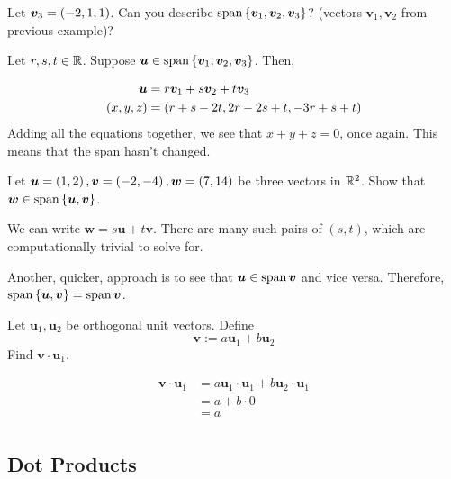 \documentclass[11pt]{article}
\begin{document}
\begin{example}
  
  Let $\bm{v}_3 = \left ( -2, 1, 1 \right)$.
  Can you describe $\operatorname{span} \left \{ \bm{v}_1, \bm{v}_2, \bm{v}_3 \right \}$? (vectors $\bm{v}_1, \bm{v}_2$ from previous example)?

  Let $r, s, t \in \mathbb R$.
  Suppose $\bm{u} \in \operatorname{span} \left \{ \bm{v}_1, \bm{v}_2, \bm{v}_3 \right \}$.
  Then,

  \begin{align*}
    \bm{u} &= r \bm{v}_1 + s \bm{v}_2 + t \bm{v}_3 \\
    \left ( x, y, z \right) &= \left ( r+s-2t, 2r-2s+t, -3r+s+t \right) \\
  \end{align*}
  Adding all the equations together, we see that $x+y+z=0$, once again.
  This means that the span hasn't changed.
\end{example}

\begin{example}
  
  Let $\bm{u} = \left ( 1,2 \right), \bm{v} = \left ( -2, -4 \right), \bm{w} = \left ( 7,14 \right)$ be three vectors in $\mathbb R^2$.
  Show that $\bm{w} \in \operatorname{span} \left \{ \bm{u}, \bm{v} \right \}$.

  We can write $\bm{w} = s \bm{u} + t \bm{v}$.
  There are many such pairs of $(s,t)$, which are computationally trivial to solve for.

  Another, quicker, approach is to see that $\bm{u} \in \operatorname{span} \bm{v}$ and vice versa.
  Therefore, $\operatorname{span} \left \{ \bm{u}, \bm{v} \right \} = \operatorname{span} \bm{v} $.
\end{example}

\begin{example}

  Let $\bm{u}_1, \bm{u}_2$ be orthogonal unit vectors.
  Define
  $$
  \bm{v} := a \bm{u}_1 + b \bm{u}_2
  $$
  Find $\bm{v} \cdot \bm{u}_1$.

  \begin{align*}
    \bm{v} \cdot \bm{u}_1 &= a \bm{u}_1 \cdot \bm{u}_1 + b \bm{u}_2 \cdot \bm{u}_1 \\
                          &= a + b \cdot 0 \\
                          &= a \\
  \end{align*}
\end{example}


\subsection{Dot Products}
\end{document}
